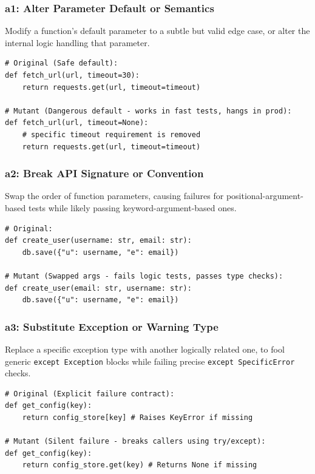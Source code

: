 \documentclass[11pt]{article}
\begin{document}
\subsubsection*{a1: Alter Parameter Default or Semantics}
Modify a function's default parameter to a subtle but valid edge case, or alter the internal logic handling that parameter.

\begin{listing}[H]
\begin{verbatim}
# Original (Safe default):
def fetch_url(url, timeout=30):
    return requests.get(url, timeout=timeout)

# Mutant (Dangerous default - works in fast tests, hangs in prod):
def fetch_url(url, timeout=None): 
    # specific timeout requirement is removed
    return requests.get(url, timeout=timeout) 
\end{verbatim}
\caption{a1: Altering default timeout parameters}
\label{code:a1}
\end{listing}

\subsubsection*{a2: Break API Signature or Convention}
Swap the order of function parameters, causing failures for positional-argument-based tests while likely passing keyword-argument-based ones.

\begin{listing}[H]
\begin{verbatim}
# Original:
def create_user(username: str, email: str):
    db.save({"u": username, "e": email})

# Mutant (Swapped args - fails logic tests, passes type checks):
def create_user(email: str, username: str):
    db.save({"u": username, "e": email})
\end{verbatim}
\caption{a2: Swapping homogeneous parameters}
\label{code:a2}
\end{listing}

\subsubsection*{a3: Substitute Exception or Warning Type}
Replace a specific exception type with another logically related one, to fool generic \texttt{except Exception} blocks while failing precise \texttt{except SpecificError} checks.

\begin{listing}[H]
\begin{verbatim}
# Original (Explicit failure contract):
def get_config(key):
    return config_store[key] # Raises KeyError if missing

# Mutant (Silent failure - breaks callers using try/except):
def get_config(key):
    return config_store.get(key) # Returns None if missing
\end{verbatim}
\caption{a3: Relaxing exception contracts (Silent Failure)}
\label{code:a3}
\end{listing}
\end{document}
